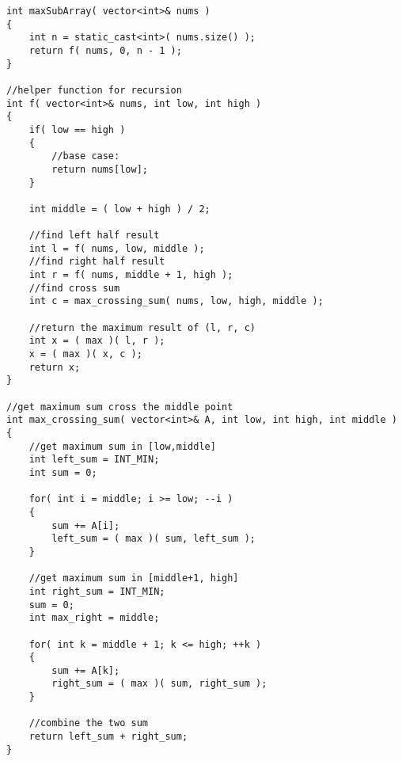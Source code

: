 \begin{lstlisting}[style=customc, caption={Divide And Conquer}]
int maxSubArray( vector<int>& nums )
{
    int n = static_cast<int>( nums.size() );
    return f( nums, 0, n - 1 );
}

//helper function for recursion
int f( vector<int>& nums, int low, int high )
{
    if( low == high )
    {
        //base case:
        return nums[low];
    }

    int middle = ( low + high ) / 2;

    //find left half result
    int l = f( nums, low, middle );
    //find right half result
    int r = f( nums, middle + 1, high );
    //find cross sum
    int c = max_crossing_sum( nums, low, high, middle );

    //return the maximum result of (l, r, c)
    int x = ( max )( l, r );
    x = ( max )( x, c );
    return x;
}

//get maximum sum cross the middle point
int max_crossing_sum( vector<int>& A, int low, int high, int middle )
{
    //get maximum sum in [low,middle]
    int left_sum = INT_MIN;
    int sum = 0;

    for( int i = middle; i >= low; --i )
    {
        sum += A[i];
        left_sum = ( max )( sum, left_sum );
    }

    //get maximum sum in [middle+1, high]
    int right_sum = INT_MIN;
    sum = 0;
    int max_right = middle;

    for( int k = middle + 1; k <= high; ++k )
    {
        sum += A[k];
        right_sum = ( max )( sum, right_sum );
    }

    //combine the two sum
    return left_sum + right_sum;
}
\end{lstlisting}
